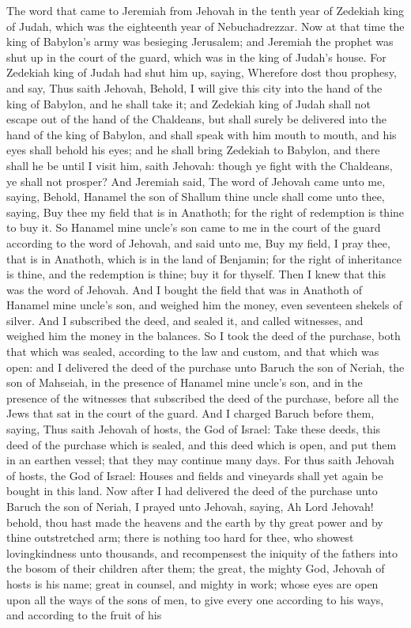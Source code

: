 The word that came to Jeremiah from Jehovah in the tenth year of Zedekiah king of Judah, which was the eighteenth year of Nebuchadrezzar. Now at that time the king of Babylon’s army was besieging Jerusalem; and Jeremiah the prophet was shut up in the court of the guard, which was in the king of Judah’s house. For Zedekiah king of Judah had shut him up, saying, Wherefore dost thou prophesy, and say, Thus saith Jehovah, Behold, I will give this city into the hand of the king of Babylon, and he shall take it; and Zedekiah king of Judah shall not escape out of the hand of the Chaldeans, but shall surely be delivered into the hand of the king of Babylon, and shall speak with him mouth to mouth, and his eyes shall behold his eyes; and he shall bring Zedekiah to Babylon, and there shall he be until I visit him, saith Jehovah: though ye fight with the Chaldeans, ye shall not prosper?  And Jeremiah said, The word of Jehovah came unto me, saying, Behold, Hanamel the son of Shallum thine uncle shall come unto thee, saying, Buy thee my field that is in Anathoth; for the right of redemption is thine to buy it. So Hanamel mine uncle’s son came to me in the court of the guard according to the word of Jehovah, and said unto me, Buy my field, I pray thee, that is in Anathoth, which is in the land of Benjamin; for the right of inheritance is thine, and the redemption is thine; buy it for thyself. Then I knew that this was the word of Jehovah. And I bought the field that was in Anathoth of Hanamel mine uncle’s son, and weighed him the money, even seventeen shekels of silver. And I subscribed the deed, and sealed it, and called witnesses, and weighed him the money in the balances. So I took the deed of the purchase, both that which was sealed, according to the law and custom, and that which was open: and I delivered the deed of the purchase unto Baruch the son of Neriah, the son of Mahseiah, in the presence of Hanamel mine uncle’s son, and in the presence of the witnesses that subscribed the deed of the purchase, before all the Jews that sat in the court of the guard. And I charged Baruch before them, saying, Thus saith Jehovah of hosts, the God of Israel: Take these deeds, this deed of the purchase which is sealed, and this deed which is open, and put them in an earthen vessel; that they may continue many days. For thus saith Jehovah of hosts, the God of Israel: Houses and fields and vineyards shall yet again be bought in this land.  Now after I had delivered the deed of the purchase unto Baruch the son of Neriah, I prayed unto Jehovah, saying, Ah Lord Jehovah! behold, thou hast made the heavens and the earth by thy great power and by thine outstretched arm; there is nothing too hard for thee, who showest lovingkindness unto thousands, and recompensest the iniquity of the fathers into the bosom of their children after them; the great, the mighty God, Jehovah of hosts is his name; great in counsel, and mighty in work; whose eyes are open upon all the ways of the sons of men, to give every one according to his ways, and according to the fruit of his 